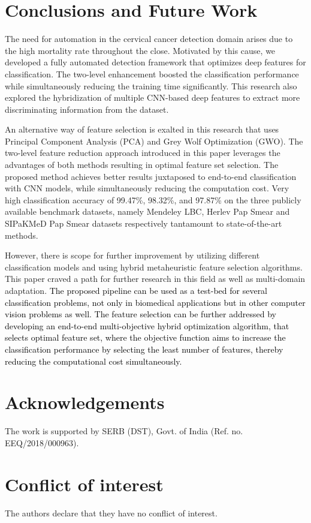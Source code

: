 \documentclass{llncs}
\begin{document}
\section{Conclusions and Future Work}\label{conclusions}
The need for automation in the cervical cancer detection domain arises due to the high mortality rate throughout the close. Motivated by this cause, we developed a fully automated detection framework that optimizes deep features for classification. The two-level enhancement boosted the classification performance while simultaneously reducing the training time significantly. This research also explored the hybridization of multiple CNN-based deep features to extract more discriminating information from the dataset.

An alternative way of feature selection is exalted in this research that uses Principal Component Analysis (PCA) and Grey Wolf Optimization (GWO). The two-level feature reduction approach introduced in this paper leverages the advantages of both methods resulting in optimal feature set selection. The proposed method achieves better results juxtaposed to end-to-end classification with CNN models, while simultaneously reducing the computation cost. Very high classification accuracy of 99.47\%, 98.32\%, and 97.87\% on the three publicly available benchmark datasets, namely Mendeley LBC, Herlev Pap Smear and SIPaKMeD Pap Smear datasets respectively tantamount to state-of-the-art methods.

However, there is scope for further improvement by utilizing different classification models and using hybrid metaheuristic feature selection algorithms. This paper craved a path for further research in this field as well as multi-domain adaptation. \textcolor{black}{The proposed pipeline can be used as a test-bed for several classification problems, not only in biomedical applications but in other computer vision problems as well. The feature selection can be further addressed by developing an end-to-end multi-objective hybrid optimization algorithm, that selects optimal feature set, where the objective function aims to increase the classification performance by selecting the least number of features, thereby reducing the computational cost simultaneously. }


\section*{Acknowledgements}
The work is supported by SERB (DST), Govt. of India (Ref. no. EEQ/2018/000963).

\section*{Conflict of interest}
The authors declare that they have no conflict of interest.



\end{document}

